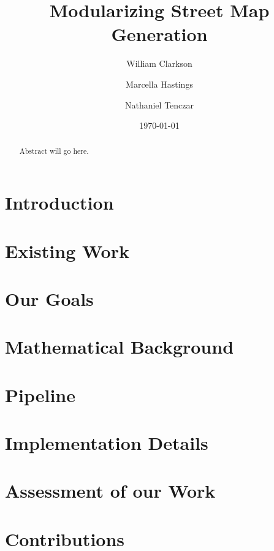 \documentclass[twocolumn]{article}
\title{Modularizing Street Map Generation}
\author{William Clarkson \and Marcella Hastings \and Nathaniel Tenczar}
\date{\today}
\begin{document}
\maketitle

\begin{abstract}
    Abstract will go here. \cite{chen}
\end{abstract}

\section{Introduction}

\section{Existing Work}

\section{Our Goals}

\section{Mathematical Background}

\section{Pipeline}

\section{Implementation Details}

\section{Assessment of our Work}

\section{Contributions}



\end{document}
